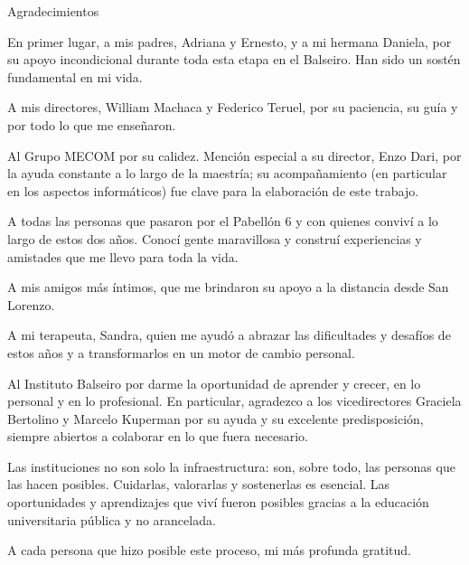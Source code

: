 \documentclass[12pt,screen,twoside]{ibtesis}
\begin{document}
\begin{postliminary}


\begin{seccion}{Agradecimientos}

En primer lugar, a mis padres, Adriana y Ernesto, y a mi hermana Daniela, por su apoyo incondicional durante toda esta etapa en el Balseiro. Han sido un sostén fundamental en mi vida.

A mis directores, William Machaca y Federico Teruel, por su paciencia, su guía y por todo lo que me enseñaron.

Al Grupo MECOM por su calidez. Mención especial a su director, Enzo Dari, por la ayuda constante a lo largo de la maestría; su acompañamiento (en particular en los aspectos informáticos) fue clave para la elaboración de este trabajo.

A todas las personas que pasaron por el Pabellón 6 y con quienes conviví a lo largo de estos dos años. Conocí gente maravillosa y construí experiencias y amistades que me llevo para toda la vida.

A mis amigos más íntimos, que me brindaron su apoyo a la distancia desde San Lorenzo.

A mi terapeuta, Sandra, quien me ayudó a abrazar las dificultades y desafíos de estos años y a transformarlos en un motor de cambio personal.

Al Instituto Balseiro por darme la oportunidad de aprender y crecer, en lo personal y en lo profesional. En particular, agradezco a los vicedirectores Graciela Bertolino y Marcelo Kuperman por su ayuda y su excelente predisposición, siempre abiertos a colaborar en lo que fuera necesario.

Las instituciones no son solo la infraestructura: son, sobre todo, las personas que las hacen posibles. Cuidarlas, valorarlas y sostenerlas es esencial. Las oportunidades y aprendizajes que viví fueron posibles gracias a la educación universitaria pública y no arancelada.

A cada persona que hizo posible este proceso, mi más profunda gratitud.



\end{seccion}
\end{postliminary}
\end{document}
